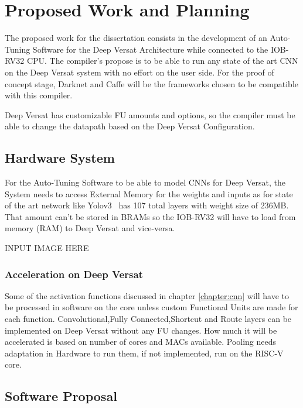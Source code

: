 \chapter{Proposed Work and Planning}
\label{chapter:PWP}

The proposed work for the dissertation consists in the development of an Auto-Tuning Software for the Deep Versat Architecture
while connected to the IOB-RV32 CPU.
The compiler's propose is to be able to run any state of the art CNN on the Deep Versat system with no effort on the user side. For the proof of concept
stage, Darknet and Caffe will be the frameworks chosen to be compatible with this compiler.

Deep Versat has customizable FU amounts and options, so the compiler must be able to change the datapath based on the Deep Versat Configuration.
  

\section{Hardware System}

For the Auto-Tuning Software to be able to model CNNs for Deep Versat, the System needs to access External Memory for the weights and inputs as for state of the art network like 
Yolov3~\cite{yolov3} has 107 total layers with weight size of 236MB. That amount can't be stored in BRAMs so the IOB-RV32 will have
to load from memory (RAM) to Deep Versat and vice-versa.

INPUT IMAGE HERE 


\subsection{Acceleration on Deep Versat}

Some of the activation functions discussed in chapter \ref{chapter:cnn} will have to be processed in software on the core unless
custom Functional Units are made for each function. Convolutional,Fully Connected,Shortcut and Route layers can be implemented on Deep Versat without
any FU changes. How much it will be accelerated is based on number of cores and MACs available. Pooling needs adaptation in Hardware to run them, if not implemented, run on the RISC-V core.


\newpage
\section{Software Proposal}


